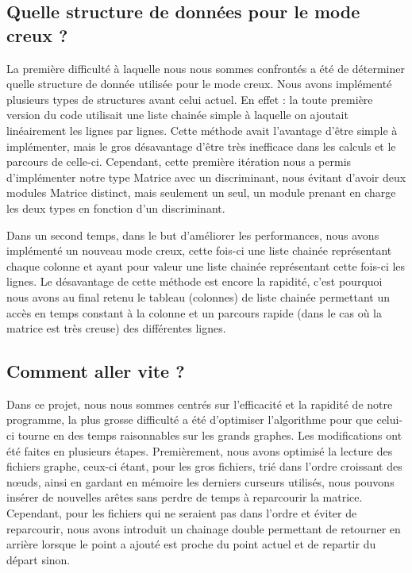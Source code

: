 \documentclass{NewTeX}
\begin{document}
\subsection{Quelle structure de données pour le mode creux ?}

La première difficulté à laquelle nous nous sommes confrontés a été de déterminer quelle structure de donnée utilisée pour le mode creux. Nous avons implémenté plusieurs types de structures avant celui actuel. En effet : la toute première version du code  utilisait une liste chainée simple à laquelle on ajoutait linéairement les lignes par lignes. Cette méthode avait l'avantage d'être simple à implémenter, mais le gros désavantage d'être très inefficace dans les calculs et le parcours de celle-ci. Cependant, cette première itération nous a permis d'implémenter notre type Matrice avec un discriminant, nous évitant d'avoir deux modules Matrice distinct, mais seulement un seul, un module prenant en charge les deux types en fonction d'un discriminant.

Dans un second temps, dans le but d'améliorer les performances, nous avons implémenté un nouveau mode creux, cette fois-ci une liste chainée représentant chaque colonne et ayant pour valeur une liste chainée représentant cette fois-ci les lignes. Le désavantage de cette méthode est encore la rapidité, c'est pourquoi nous avons au final retenu le tableau (colonnes) de liste chainée permettant un accès en temps constant à la colonne et un parcours rapide (dans le cas où la matrice est très creuse) des différentes lignes.


\subsection{Comment aller vite ?}

Dans ce projet, nous nous sommes centrés sur l'efficacité et la rapidité de notre programme, la plus grosse difficulté a été d'optimiser l'algorithme pour que celui-ci tourne en des temps raisonnables sur les grands graphes. Les modifications ont été faites en plusieurs étapes. Premièrement, nous avons optimisé la lecture des fichiers graphe, ceux-ci étant, pour les gros fichiers, trié dans l'ordre croissant des nœuds, ainsi en gardant en mémoire les derniers curseurs utilisés, nous pouvons insérer de nouvelles arêtes sans perdre de temps à reparcourir la matrice. Cependant, pour les fichiers qui ne seraient pas dans l'ordre et éviter de reparcourir, nous avons introduit un chainage double permettant de retourner en arrière lorsque le point a ajouté est proche du point actuel et de repartir du départ sinon.
\end{document}
